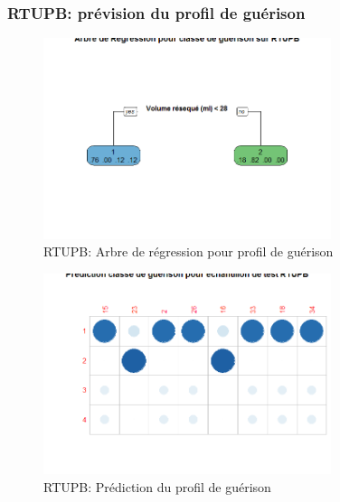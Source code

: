 %
%

%

\subsubsection{RTUPB: prévision du profil de guérison}
\begin{figure}[H]
\centering
\includegraphics[width=0.75\textwidth]{../Fig/RTUPB/rtupb-regtree-healing-class.png}
\caption{RTUPB: Arbre de régression pour profil de guérison}
\label{fig-rtupb-regtree-ipss12}
\end{figure}

\begin{figure}[H]
\centering
\includegraphics[width=0.75\textwidth]{../Fig/RTUPB/rtupb-predict-healing-class.png}
\caption{RTUPB: Prédiction du profil de guérison}
\label{fig-rtupb-regtree-predict-ipss12}
\end{figure}


